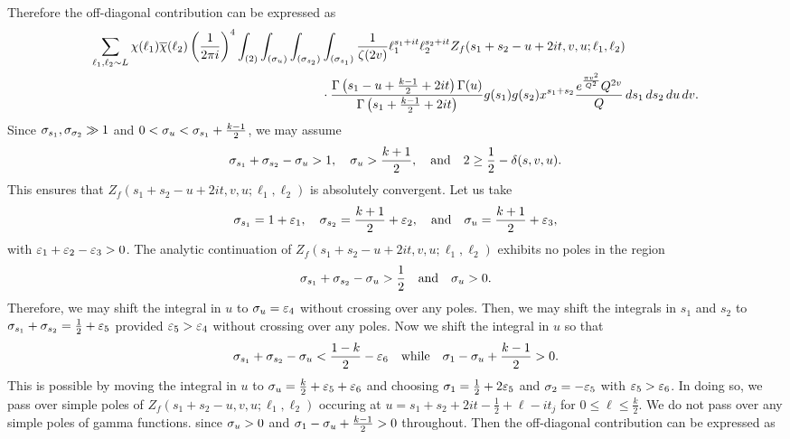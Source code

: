 \documentclass[12pt,reqno,oneside]{amsart}
\begin{document}
    Therefore the off-diagonal contribution can be expressed as
    \begin{align*}
      \sum_{\ell_{1},\ell_{2} \sim L}\chi(\ell_{1})\overline{\chi}(\ell_{2})\left(\frac{1}{2\pi i}\right)^{4}\int_{(2)}\int_{(\sigma_{u})}\int_{(\sigma_{s_{2}})}&\int_{(\sigma_{s_{1}})}\frac{1}{\zeta(2v)}\ell_{1}^{s_{1}+it}\ell_{2}^{s_{2}+it}Z_{f}(s_{1}+s_{2}-u+2it,v,u;\ell_{1},\ell_{2}) \\
      &\cdot \frac{\Gamma\left(s_{1}-u+\frac{k-1}{2}+2it\right)\Gamma(u)}{\Gamma\left(s_{1}+\frac{k-1}{2}+2it\right)}g(s_{1})g(s_{2})x^{s_{1}+s_{2}}\frac{e^{\frac{\pi v^{2}}{Q^{2}}}Q^{2v}}{Q}\,ds_{1}\,ds_{2}\,du\,dv.
    \end{align*}
    Since $\sigma_{s_{1}},\sigma_{\sigma_{2}} \gg 1$ and $0 < \sigma_{u} < \sigma_{s_{1}}+\frac{k-1}{2}$, we may assume
    \[
      \sigma_{s_{1}}+\sigma_{s_{2}}-\sigma_{u} > 1, \quad \sigma_{u} > \frac{k+1}{2}, \quad \text{and} \quad 2 \ge \frac{1}{2}-\delta(s,v,u).
    \]
    This ensures that $Z_{f}(s_{1}+s_{2}-u+2it,v,u;\ell_{1},\ell_{2})$ is absolutely convergent. Let us take
    \[
      \sigma_{s_{1}} = 1+\varepsilon_{1}, \quad \sigma_{s_{2}} = \frac{k+1}{2}+\varepsilon_{2}, \quad \text{and} \quad \sigma_{u} = \frac{k+1}{2}+\varepsilon_{3},
    \]
    with $\varepsilon_{1}+\varepsilon_{2}-\varepsilon_{3} > 0$. The analytic continuation of $Z_{f}(s_{1}+s_{2}-u+2it,v,u;\ell_{1},\ell_{2})$ exhibits no poles in the region
    \[
      \sigma_{s_{1}}+\sigma_{s_{2}}-\sigma_{u} > \frac{1}{2} \quad \text{and} \quad \sigma_{u} > 0.
    \]
    Therefore, we may shift the integral in $u$ to $\sigma_{u} = \varepsilon_{4}$ without crossing over any poles. Then, we may shift the integrals in $s_{1}$ and $s_{2}$ to $\sigma_{s_{1}}+\sigma_{s_{2}} = \frac{1}{2}+\varepsilon_{5}$ provided $\varepsilon_{5} > \varepsilon_{4}$ without crossing over any poles. Now we shift the integral in $u$ so that
    \[
      \sigma_{s_{1}}+\sigma_{s_{2}}-\sigma_{u} < \frac{1-k}{2}-\varepsilon_{6} \quad \text{while} \quad \sigma_{1}-\sigma_{u}+\frac{k-1}{2} > 0.
    \]
    This is possible by moving the integral in $u$ to $\sigma_{u} = \frac{k}{2}+\varepsilon_{5}+\varepsilon_{6}$ and choosing $\sigma_{1} = \frac{1}{2}+2\varepsilon_{5}$ and $\sigma_{2} = -\varepsilon_{5}$ with $\varepsilon_{5} > \varepsilon_{6}$. In doing so, we pass over simple poles of $Z_{f}(s_{1}+s_{2}-u,v,u;\ell_{1},\ell_{2})$ occuring at $u = s_{1}+s_{2}+2it-\frac{1}{2}+\ell-it_{j}$ for $0 \le \ell \le \frac{k}{2}$. We do not pass over any simple poles of gamma functions. since $\sigma_{u} > 0$ and $\sigma_{1}-\sigma_{u}+\frac{k-1}{2} > 0$ throughout. Then the off-diagonal contribution can be expressed as
\end{document}
